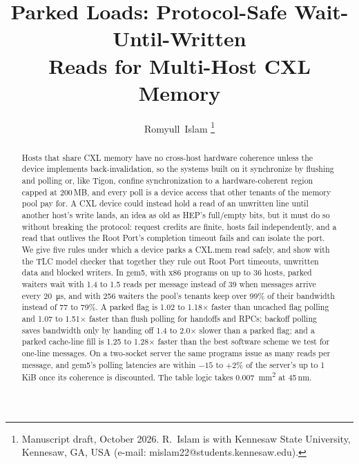 \documentclass[journal]{IEEEtran}
\begin{document}

\title{Parked Loads: Protocol-Safe Wait-Until-Written\\Reads for Multi-Host CXL Memory}

\author{Romyull~Islam
\thanks{Manuscript draft, October 2026. R.~Islam is with Kennesaw State University, Kennesaw, GA,
USA (e-mail: mislam22@students.kennesaw.edu).}}%


\maketitle

\begin{abstract}
Hosts that share CXL memory have no cross-host hardware coherence unless the device implements
back-invalidation, so the systems built on it synchronize by flushing and polling or, like Tigon,
confine synchronization to a hardware-coherent region capped at 200\,MB, and
every poll is a device access that other tenants of the memory pool pay for. A CXL device could
instead hold a read of an unwritten line until another host's write lands, an idea as old as HEP's full/empty bits, but it must
do so without breaking the protocol: request credits are finite, hosts
fail independently, and a read that outlives the Root Port's completion timeout fails and can
isolate the port. We give five rules under which a device parks a CXL.mem read safely, and show
with the TLC model checker that together they rule out Root Port timeouts, unwritten data and
blocked writers. In gem5, with x86 programs on up to 36 hosts, parked waiters wait with 1.4 to 1.5
reads per message instead of 39 when messages arrive every \SI{20}{\micro\second}, and with 256 waiters the pool's tenants keep over 99\% of
their bandwidth instead of 77 to 79\%. A parked flag is 1.02 to 1.18$\times$ faster than uncached
flag polling and 1.07 to 1.51$\times$ faster than flush polling for handoffs and RPCs; backoff polling saves bandwidth only by
handing off 1.4 to 2.0$\times$ slower than a parked flag; and a parked cache-line fill is 1.25 to 1.28$\times$ faster than the
best software scheme we test for one-line messages. On a two-socket server the same programs issue
as many reads per message, and gem5's polling latencies are within $-15$ to $+2\%$ of the server's
up to 1\,KiB once its coherence is discounted. The table logic takes \SI{0.007}{\milli\meter\squared} at 45\,nm.
\end{abstract}
\end{document}
